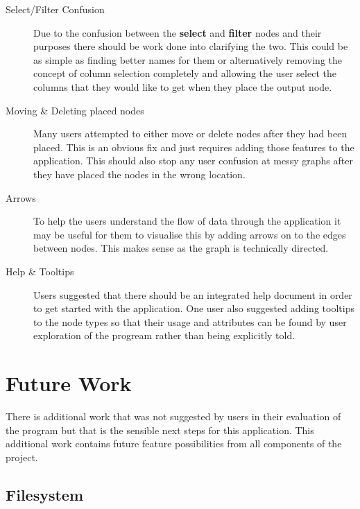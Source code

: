\begin{description}
\begin{itemize}
\end{itemize}

\item[Select/Filter Confusion] \hfill

Due to the confusion between the \textbf{select} and \textbf{filter} nodes and
their purposes there should be work done into clarifying the two. This could be
as simple as finding better names for them or alternatively removing the
concept of column selection completely and allowing the user select the columns
that they would like to get when they place the output node.

\item[Moving \& Deleting placed nodes] \hfill

Many users attempted to either move or delete nodes after they had been placed.
This is an obvious fix and just requires adding those features to the
application. This should also stop any user confusion at messy graphs after
they have placed the nodes in the wrong location.

\item[Arrows] \hfill

To help the users understand the flow of data through the application it may be
useful for them to visualise this by adding arrows on to the edges between
nodes. This makes sense as the graph is technically directed.

\item[Help \& Tooltips] \hfill

Users suggested that there should be an integrated help document in order to
get started with the application. One user also suggested adding tooltips to
the node types so that their usage and attributes can be found by user
exploration of the progream rather than being explicitly told.

\end{description}

\section{Future Work}

There is additional work that was not suggested by users in their evaluation of
the program but that is the sensible next steps for this application. This
additional work contains future feature possibilities from all components of
the project.

\subsection{Filesystem}


